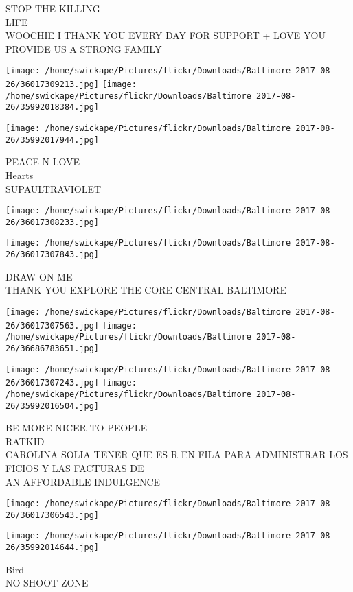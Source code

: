 \documentclass[10pt,letterpaper]{article}
\begin{document}
STOP THE KILLING\\
LIFE\\
WOOCHIE I THANK YOU EVERY DAY FOR SUPPORT + LOVE YOU PROVIDE US A STRONG FAMILY
\pagebreak

\texttt{[image: /home/swickape/Pictures/flickr/Downloads/Baltimore 2017-08-26/36017309213.jpg]}
\texttt{[image: /home/swickape/Pictures/flickr/Downloads/Baltimore 2017-08-26/35992018384.jpg]}

\texttt{[image: /home/swickape/Pictures/flickr/Downloads/Baltimore 2017-08-26/35992017944.jpg]}

PEACE N LOVE\\
Hearts\\
SUPAULTRAVIOLET
\pagebreak

\texttt{[image: /home/swickape/Pictures/flickr/Downloads/Baltimore 2017-08-26/36017308233.jpg]}

\vspace{0.25in}
\texttt{[image: /home/swickape/Pictures/flickr/Downloads/Baltimore 2017-08-26/36017307843.jpg]}

DRAW ON ME\\
THANK YOU EXPLORE THE CORE CENTRAL BALTIMORE
\pagebreak

\texttt{[image: /home/swickape/Pictures/flickr/Downloads/Baltimore 2017-08-26/36017307563.jpg]}
\texttt{[image: /home/swickape/Pictures/flickr/Downloads/Baltimore 2017-08-26/36686783651.jpg]}

\texttt{[image: /home/swickape/Pictures/flickr/Downloads/Baltimore 2017-08-26/36017307243.jpg]}
\texttt{[image: /home/swickape/Pictures/flickr/Downloads/Baltimore 2017-08-26/35992016504.jpg]}

BE MORE NICER TO PEOPLE\\
RATKID\\
CAROLINA SOLIA TENER QUE ES R EN FILA PARA ADMINISTRAR LOS FICIOS Y LAS FACTURAS DE\\
AN AFFORDABLE INDULGENCE
\pagebreak

\texttt{[image: /home/swickape/Pictures/flickr/Downloads/Baltimore 2017-08-26/36017306543.jpg]}

\vspace{0.25in}
\texttt{[image: /home/swickape/Pictures/flickr/Downloads/Baltimore 2017-08-26/35992014644.jpg]}

Bird\\
NO SHOOT ZONE
\pagebreak
\end{document}

